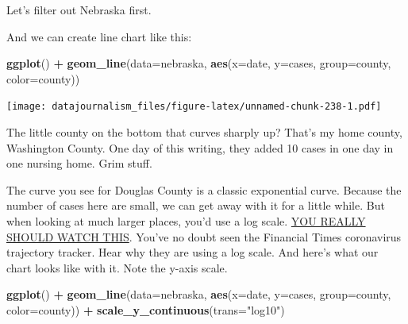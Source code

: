 \documentclass[]{book}
\newenvironment{Shaded}{\begin{snugshade}}{\end{snugshade}}
\newcommand{\DataTypeTok}[1]{\textcolor[rgb]{0.13,0.29,0.53}{#1}}
\newcommand{\KeywordTok}[1]{\textcolor[rgb]{0.13,0.29,0.53}{\textbf{#1}}}
\newcommand{\NormalTok}[1]{#1}
\newcommand{\OperatorTok}[1]{\textcolor[rgb]{0.81,0.36,0.00}{\textbf{#1}}}
\newcommand{\StringTok}[1]{\textcolor[rgb]{0.31,0.60,0.02}{#1}}
\begin{document}
Let's filter out Nebraska first.

\begin{Shaded}
\end{Shaded}

And we can create line chart like this:

\begin{Shaded}
\begin{Highlighting}[]
\KeywordTok{ggplot}\NormalTok{() }\OperatorTok{+}\StringTok{ }\KeywordTok{geom_line}\NormalTok{(}\DataTypeTok{data=}\NormalTok{nebraska, }\KeywordTok{aes}\NormalTok{(}\DataTypeTok{x=}\NormalTok{date, }\DataTypeTok{y=}\NormalTok{cases, }\DataTypeTok{group=}\NormalTok{county, }\DataTypeTok{color=}\NormalTok{county))}
\end{Highlighting}
\end{Shaded}

\texttt{[image: datajournalism\_files/figure-latex/unnamed-chunk-238-1.pdf]}

The little county on the bottom that curves sharply up? That's my home county, Washington County. One day of this writing, they added 10 cases in one day in one nursing home. Grim stuff.

The curve you see for Douglas County is a classic exponential curve. Because the number of cases here are small, we can get away with it for a little while. But when looking at much larger places, you'd use a log scale. \href{https://www.ft.com/video/9a72a9d4-8db1-4615-8333-4b73ae3ddff8}{YOU REALLY SHOULD WATCH THIS}. You've no doubt seen the Financial Times coronavirus trajectory tracker. Hear why they are using a log scale. And here's what our chart looks like with it. Note the y-axis scale.

\begin{Shaded}
\begin{Highlighting}[]
\KeywordTok{ggplot}\NormalTok{() }\OperatorTok{+}\StringTok{ }\KeywordTok{geom_line}\NormalTok{(}\DataTypeTok{data=}\NormalTok{nebraska, }\KeywordTok{aes}\NormalTok{(}\DataTypeTok{x=}\NormalTok{date, }\DataTypeTok{y=}\NormalTok{cases, }\DataTypeTok{group=}\NormalTok{county, }\DataTypeTok{color=}\NormalTok{county)) }\OperatorTok{+}\StringTok{ }\KeywordTok{scale_y_continuous}\NormalTok{(}\DataTypeTok{trans=}\StringTok{"log10"}\NormalTok{)}
\end{Highlighting}
\end{Shaded}
\end{document}
